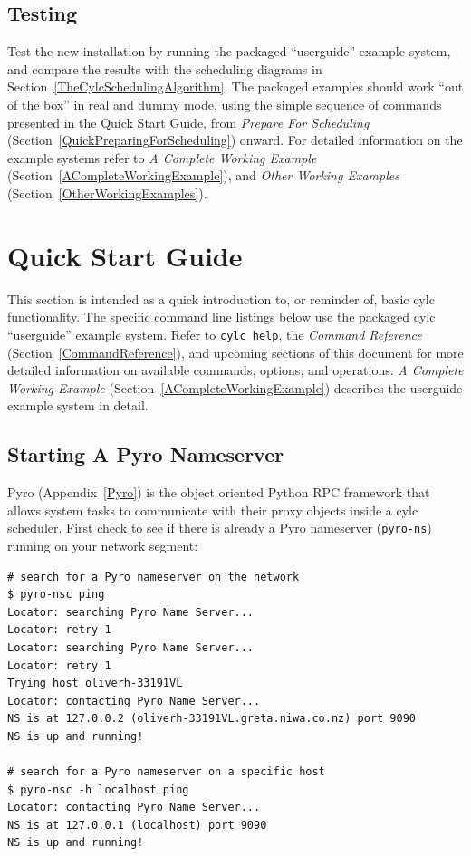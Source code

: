 \documentclass[11pt,a4paper]{article}
\begin{document}
\subsection{Testing} 
\label{Testing}

Test the new installation by running the packaged ``userguide'' example
system, and compare the results with the scheduling diagrams in
Section~\ref{TheCylcSchedulingAlgorithm}. The packaged examples should
work ``out of the box'' in real and dummy mode, using the simple
sequence of commands presented in the Quick Start Guide, from {\em
Prepare For Scheduling} (Section~\ref{QuickPreparingForScheduling})
onward.  For detailed information on the example systems refer
to {\em A Complete Working Example}
(Section~\ref{ACompleteWorkingExample}), and {\em Other Working Examples} 
(Section~\ref{OtherWorkingExamples}).  

\pagebreak
\section{Quick Start Guide} 
\label{QuickStartGuide}

\lstset{language=bash}

This section is intended as a quick introduction to, or reminder of,
basic cylc functionality. The specific command line listings below use
the packaged cylc ``userguide'' example system. Refer to 
\lstinline=cylc help=, the {\em Command Reference}
(Section~\ref{CommandReference}), and
upcoming sections of this document for more detailed information on
available commands, options, and operations.  {\em A Complete Working
Example} (Section~\ref{ACompleteWorkingExample}) describes the
userguide example system in detail.

\subsection{Starting A Pyro Nameserver}
\label{QuickStartingAPyroNameserver}

Pyro (Appendix~\ref{Pyro}) is the object oriented Python RPC framework
that allows system tasks to communicate with their proxy objects inside
a cylc scheduler. First check to see if there is already a Pyro
nameserver (\lstinline=pyro-ns=) running on your network segment:

\begin{lstlisting}
# search for a Pyro nameserver on the network
$ pyro-nsc ping
Locator: searching Pyro Name Server...
Locator: retry 1
Locator: searching Pyro Name Server...
Locator: retry 1
Trying host oliverh-33191VL
Locator: contacting Pyro Name Server...
NS is at 127.0.0.2 (oliverh-33191VL.greta.niwa.co.nz) port 9090
NS is up and running!

# search for a Pyro nameserver on a specific host
$ pyro-nsc -h localhost ping
Locator: contacting Pyro Name Server...
NS is at 127.0.0.1 (localhost) port 9090
NS is up and running!
\end{lstlisting}
\end{document}
